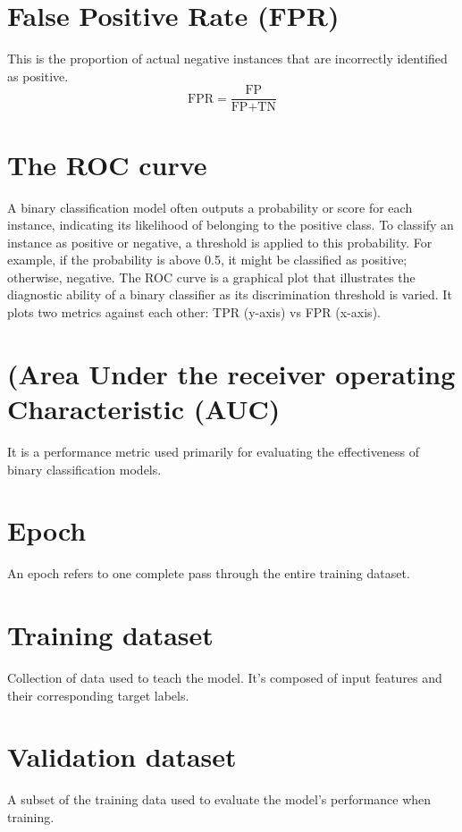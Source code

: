 \section{False Positive Rate (FPR)}
This is the proportion of actual negative instances that are incorrectly identified as positive.
\begin{equation}
  \text{FPR} = \frac{\text{FP}}{\text{FP}+\text{TN}}
\end{equation}

\section{The ROC curve}
A binary classification model often outputs a probability or score for
each instance, indicating its likelihood of belonging to the positive
class. To classify an instance as positive or negative, a threshold is
applied to this probability. For example, if the probability is above
0.5, it might be classified as positive; otherwise, negative. The ROC
curve is a graphical plot that illustrates the diagnostic ability of a
binary classifier as its discrimination threshold is varied. It plots
two metrics against each other: TPR (y-axis) vs FPR (x-axis).

\section{(Area Under the receiver operating Characteristic (AUC)}
It is a performance metric used primarily for evaluating the effectiveness of binary classification models.

\section{Epoch}
An epoch refers to one complete pass through the entire training dataset.

\section{Training dataset}
Collection of data used to teach the model. It's composed of input
features and their corresponding target labels.

\section{Validation dataset}
A subset of the training data used to evaluate the model's performance
when training.

